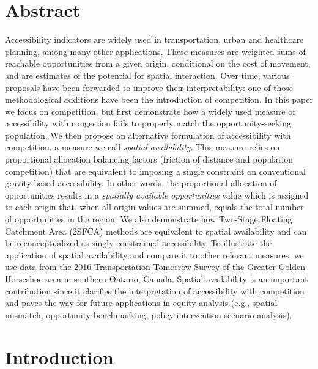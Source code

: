 \documentclass[10pt,letterpaper]{article}
\begin{document}
\section*{Abstract}
Accessibility indicators are widely used in transportation, urban and
healthcare planning, among many other applications. These measures are
weighted sums of reachable opportunities from a given origin,
conditional on the cost of movement, and are estimates of the potential
for spatial interaction. Over time, various proposals have been
forwarded to improve their interpretability: one of those methodological
additions have been the introduction of competition. In this paper we
focus on competition, but first demonstrate how a widely used measure of
accessibility with congestion fails to properly match the
opportunity-seeking population. We then propose an alternative
formulation of accessibility with competition, a measure we call
\emph{spatial availability}. This measure relies on proportional
allocation balancing factors (friction of distance and population
competition) that are equivalent to imposing a single constraint on
conventional gravity-based accessibility. In other words, the
proportional allocation of opportunities results in a \emph{spatially
available opportunities} value which is assigned to each origin that,
when all origin values are summed, equals the total number of
opportunities in the region. We also demonstrate how Two-Stage Floating
Catchment Area (2SFCA) methods are equivalent to spatial availability
and can be reconceptualized as singly-constrained accessibility. To
illustrate the application of spatial availability and compare it to
other relevant measures, we use data from the 2016 Transportation
Tomorrow Survey of the Greater Golden Horseshoe area in southern
Ontario, Canada. Spatial availability is an important contribution since
it clarifies the interpretation of accessibility with competition and
paves the way for future applications in equity analysis (e.g., spatial
mismatch, opportunity benchmarking, policy intervention scenario
analysis).


\linenumbers

\newpage

\hypertarget{sec:introduction}{%
\section{Introduction}\label{sec:introduction}}
\end{document}
